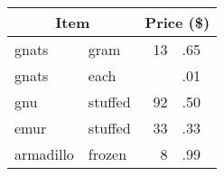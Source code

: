 \begin{tabular}{llr@{}l}
\hline
\multicolumn{2}{c}{{\small Item}}
& \multicolumn{2}{c}{{\small Price (\$)}} \\
\hline
gnats     & gram    & 13&.65 \\
gnats     & each    &   &.01 \\
gnu       & stuffed & 92&.50 \\
emur      & stuffed & 33&.33 \\
armadillo & frozen  &  8&.99 \\
\hline
\end{tabular}
